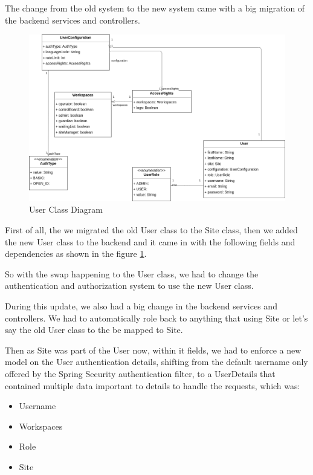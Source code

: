The change from the old system to the new system came with a big migration of the backend
services and controllers.

\begin{figure}[!ht]
    \centering
    \includegraphics[width=1\textwidth]{images/userClass.png}
    \caption{User Class Diagram}
    \label{fig:userClass}
\end{figure}

First of all, the we migrated the old User class to the Site class, then we added the new
User class to the backend and it came in with the following fields and dependencies as shown
in the figure \ref{fig:userClass}.

So with the swap happening to the User class, we had to change the authentication and
authorization system to use the new User class.

During this update, we also had a big change in the backend services and controllers.
We had to automatically role back to anything that using Site or let's say the old User 
class to the be mapped to Site.

Then as Site was part of the User now, within it fields, we had to enforce a new model 
on the User authentication details, shifting from the default username only offered
by the Spring Security authentication filter, to a UserDetails that contained multiple 
data important to details to handle the requests, which was:
\begin{itemize}
    \item Username
    \item Workspaces
    \item Role
    \item Site
\end{itemize}

